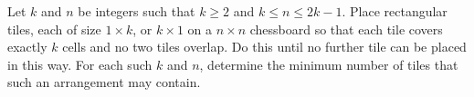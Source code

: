 Let $k$ and $n$ be integers such that $k\ge 2$ and $k \le n \le 2k-1$. Place rectangular tiles, each of size $1 \times k$, or $k \times 1$ on a $n \times n$ chessboard so that each tile covers exactly $k$ cells and no two tiles overlap. Do this until no further tile can be placed in this way. For each such $k$ and $n$, determine the minimum number of tiles that such an arrangement may contain.